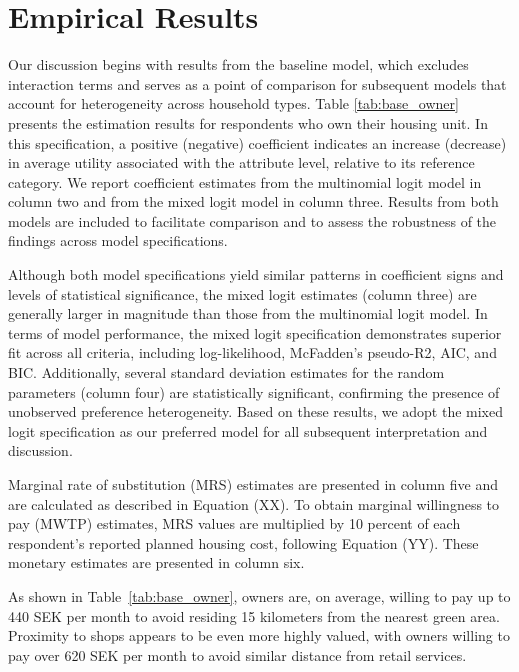 \documentclass[3p,11pt ]{elsarticle}
\begin{document}


\clearpage

\section{Empirical Results}


Our discussion begins with results from the baseline model, which excludes interaction terms and serves as a point of comparison for subsequent models that account for heterogeneity across household types.
Table \ref{tab:base_owner} presents the estimation results for respondents who own their housing unit.
In this specification, a positive (negative) coefficient indicates an increase (decrease) in average utility associated with the attribute level, relative to its reference category. We report coefficient estimates from the multinomial logit model in column two and from the mixed logit model in column three.
Results from both models are included to facilitate comparison and to assess the robustness of the findings across model specifications.




Although both model specifications yield similar patterns in coefficient signs and levels of statistical significance, the mixed logit estimates (column three) are generally larger in magnitude than those from the multinomial logit model. In terms of model performance, the mixed logit specification demonstrates superior fit across all criteria, including log-likelihood, McFadden's pseudo-R2, AIC, and BIC.
Additionally, several standard deviation estimates for the random parameters (column four) are statistically significant, confirming the presence of unobserved preference heterogeneity.
Based on these results, we adopt the mixed logit specification as our preferred model for all subsequent interpretation and discussion.

Marginal rate of substitution (MRS) estimates are presented in column five and are calculated as described in Equation (XX). To obtain marginal willingness to pay (MWTP) estimates, MRS values are multiplied by 10 percent of each respondent's reported planned housing cost, following Equation (YY). These monetary estimates are presented in column six.

As shown in Table~\ref{tab:base_owner}, owners are, on average, willing to pay up to 440 SEK per month to avoid residing 15 kilometers from the nearest green area. Proximity to shops appears to be even more highly valued, with owners willing to pay over 620 SEK per month to avoid similar distance from retail services.
\end{document}
